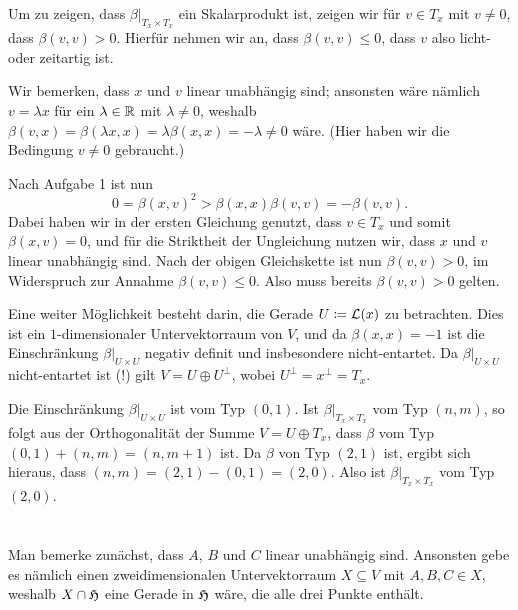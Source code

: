 \documentclass[a4paper,10pt,numbers=noenddot]{scrartcl}
\begin{document}
Um zu zeigen, dass $\beta|_{T_x \times T_x}$ ein Skalarprodukt ist, zeigen wir für $v \in T_x$ mit $v \neq 0$, dass $\beta(v,v) > 0$.
Hierfür nehmen wir an, dass $\beta(v, v) \leq 0$, dass $v$ also licht- oder zeitartig ist.

Wir bemerken, dass $x$ und $v$ linear unabhängig sind; ansonsten wäre nämlich $v = \lambda x$ für ein $\lambda \in \mathbb{R}$ mit $\lambda \neq 0$, weshalb $\beta(v,x) = \beta(\lambda x, x) = \lambda \beta(x,x) = - \lambda \neq 0$ wäre.
(Hier haben wir die Bedingung $v \neq 0$ gebraucht.)

Nach Aufgabe 1 ist nun
\[
     0
  = \beta(x,v)^2
  > \beta(x,x) \beta(v,v)
  = -\beta(v,v).
\]
Dabei haben wir in der ersten Gleichung genutzt, dass $v \in T_x$ und somit $\beta(x,v) = 0$, und für die Striktheit der Ungleichung nutzen wir, dass $x$ und $v$ linear unabhängig sind.
Nach der obigen Gleichskette ist nun $\beta(v,v) > 0$, im Widerspruch zur Annahme $\beta(v,v) \leq 0$.
Also muss bereits $\beta(v,v) > 0$ gelten.


\begin{remark}
  Eine weiter Möglichkeit besteht darin, die Gerade $U \coloneqq \operatorname{\mathcal{L}}(x)$ zu betrachten.
  Dies ist ein $1$-dimensionaler Untervektorraum von $V$, und da $\beta(x,x) = -1$ ist die Einschränkung $\beta|_{U \times U}$ negativ definit und insbesondere nicht-entartet.
  Da $\beta|_{U \times U}$ nicht-entartet ist (!) gilt $V = U \oplus U^\perp$, wobei $U^\perp = x^\perp = T_x$.
  
  Die Einschränkung $\beta|_{U \times U}$ ist vom Typ $(0,1)$.
  Ist $\beta|_{T_x \times T_x}$ vom Typ $(n,m)$, so folgt aus der Orthogonalität der Summe $V = U \oplus T_x$, dass $\beta$ vom Typ $(0,1) + (n,m) = (n,m+1)$ ist.
  Da $\beta$ von Typ $(2,1)$ ist, ergibt sich hieraus, dass $(n,m) = (2,1) - (0,1) = (2,0)$.
  Also ist $\beta|_{T_x \times T_x}$ vom Typ $(2,0)$.
\end{remark}











\section{}

Man bemerke zunächst, dass $A$, $B$ und $C$ linear unabhängig sind.
Ansonsten gebe es nämlich einen zweidimensionalen Untervektorraum $X \subseteq V$ mit $A, B, C \in X$, weshalb $X \cap \mathfrak{H}$ eine Gerade in $\mathfrak{H}$ wäre, die alle drei Punkte enthält.
\end{document}
